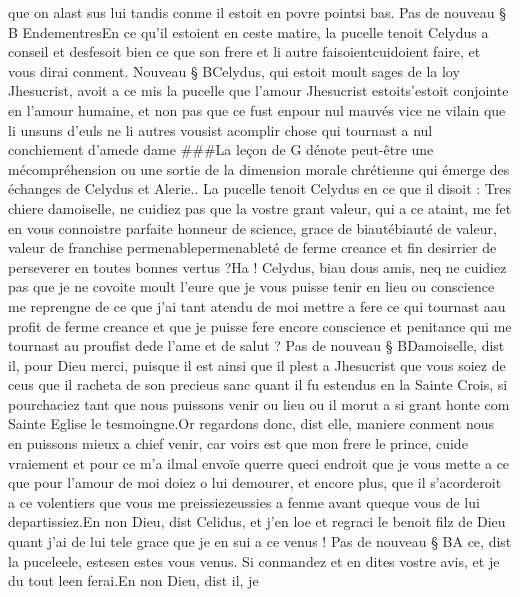 \documentclass{article}
\begin{document}
\begin{pages}
      que on alast sus lui tandis conme il estoit en povre pointsi bas. \pend
\pstart Pas de nouveau § B
   EndementresEn ce qu’il estoient en ceste matire, 
   la pucelle tenoit Celydus a conseil et desfesoit bien ce que 
   son frere et li autre 
   faisoientcuidoient faire, et vous dirai conment. 
   Nouveau § BCelydus, 
   qui estoit moult sages de la loy Jhesucrist, avoit a ce mis la pucelle que l’amour Jhesucrist 
   estoits'estoit conjointe en l’amour 
   humaine, et non pas que ce fust 
   enpour nul 
   mauvés vice ne vilain 
   que li unsuns d'euls ne li autres vousist 
   acomplir chose qui tournast a nul conchiement d’amede dame
   ###La leçon de G dénote peut-être une mécompréhension ou une sortie de la dimension morale chrétienne 
   qui émerge des échanges de Celydus et Alerie.. 
   La pucelle tenoit 
   Celydus en ce que il disoit :
   Tres chiere damoiselle, ne cuidiez pas que la vostre grant valeur, qui a ce ataint, 
      me fet en vous connoistre parfaite honneur de science, grace de 
      biautébiauté de valeur, valeur de franchise 
      permenablepermenableté de ferme creance 
   et fin desirrier de perseverer en toutes bonnes vertus ?Ha ! Celydus, biau dous amis, 
      neq ne cuidiez pas que je 
      ne covoite moult l’eure que je vous puisse tenir en lieu ou conscience me reprengne de ce que j’ai tant atendu de moi mettre a fere 
      ce qui tournast aau profit de ferme creance et que 
      je puisse fere encore 
      conscience et penitance qui me tournast au proufist 
      dede l'ame et de salut ? \pend
\pstart Pas de nouveau § BDamoiselle, dist il, 
   pour Dieu merci, puisque il est ainsi que il plest 
   a Jhesucrist que vous soiez de ceus que il racheta de son precieus sanc quant il fu estendus en la Sainte Crois, 
   si pourchaciez tant que nous puissons venir ou lieu ou il morut a si grant honte com Sainte Eglise le tesmoingne.Or regardons donc, dist elle, maniere 
      conment nous en puissons mieux a chief venir, 
   car voirs est que mon frere le prince, cuide vraiement et pour ce 
      m’a ilmal envoïe 
      querre queci endroit que 
   je vous mette a ce que pour l’amour de moi doiez o lui demourer, et encore plus, que il s’acorderoit a ce volentiers que vous 
   me preissiezeussies a fenme avant 
      queque vous de lui departissiez.En non Dieu, dist Celidus, et j’en loe et regraci le benoit filz 
      de Dieu quant j’ai de lui tele grace que je en sui a ce venus ! \pend
\pstart Pas de nouveau § BA ce, dist 
   la puceleele, 
   estesen estes vous venus. 
   Si conmandez et en dites vostre avis, et je du tout leen ferai.En non Dieu, dist il, je 

\end{pages}
\end{document}
